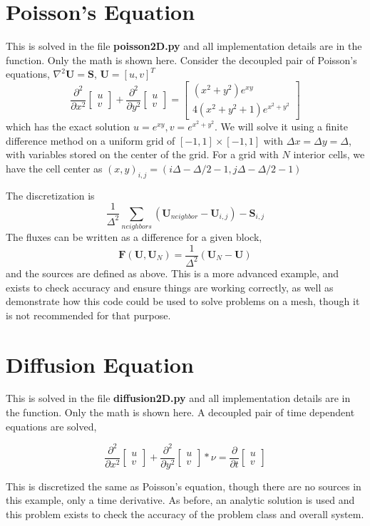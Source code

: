 \documentclass[11pt]{article}
\begin{document}
\section{Poisson's Equation}
This is solved in the file {\bf poisson2D.py} and all implementation details are in the function. Only the math is shown here. Consider the decoupled pair of Poisson's equations, $\nabla^2 \mathbf{U} = \mathbf{S}$, $\mathbf{U} = [u,v]^T$
\[
\frac{\partial^2}{\partial x^2}\left[ \begin{array}{c} u \\ v \end{array}\right] + \frac{\partial^2}{\partial y^2}\left[ \begin{array}{c} u \\ v \end{array}\right]  = \left[ \begin{array}{c} (x^2+y^2)e^{xy} \\ 4(x^2+y^2+1)e^{x^2+y^2}  \end{array}\right]
\]
which has the exact solution $u = e^{xy}, v = e^{x^2+y^2}$. We will solve it using a finite difference method on a uniform grid of $[-1,1]\times[-1,1]$ with $\Delta x = \Delta y = \Delta$, with variables stored on the center of the grid. For a grid with $N$ interior cells, we have the cell center as $(x,y)_{i,j} = (i\Delta-\Delta/2-1, j\Delta-\Delta/2-1)$

The discretization is
\[
\frac{1}{\Delta^2}\sum_{neighbors} (\mathbf{U}_{neighbor}-\mathbf{U}_{i,j}) - \mathbf{S}_{i,j}
\]
The fluxes can be written as a difference for a given block,
\[
\mathbf{F}(\mathbf{U},\mathbf{U}_N) = \frac{1}{\Delta^2}(\mathbf{U}_N - \mathbf{U})
\]
and the sources are defined as above. This is a more advanced example, and exists to check accuracy and ensure things are working correctly, as well as demonstrate how this code could be used to solve problems on a mesh, though it is not recommended for that purpose.
\section{Diffusion Equation}
This is solved in the file {\bf diffusion2D.py} and all implementation details are in the function. Only the math is shown here. A decoupled pair of time dependent equations are solved,

\[
\frac{\partial^2}{\partial x^2}\left[ \begin{array}{c} u \\ v \end{array}\right] + \frac{\partial^2}{\partial y^2}\left[ \begin{array}{c} u \\ v \end{array}\right]*\nu  = \frac{\partial}{\partial t}\left[ \begin{array}{c} u \\ v \end{array}\right]
\]

This is discretized the same as Poisson's equation, though there are no sources in this example, only a time derivative. As before, an analytic solution is used and this problem exists to check the accuracy of the problem class and overall system.
\end{document}
